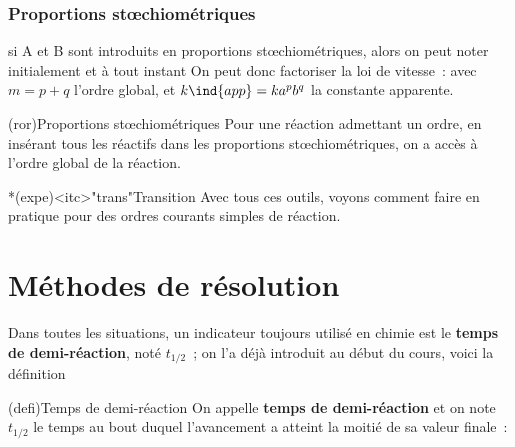 \documentclass[../../main/main.tex]{subfiles}
\begin{document}
\subsubsection{Proportions stœchiométriques}
\smallbreak
\noindent
si A et B sont introduits en proportions stœchiométriques, alors on peut
noter initialement
\psw{
	\[
		[{\ce{A}}]_0 = ac_0
		\qet
		[{\ce{B}}]_0 = bc_0
	\]
}
et à tout instant
\psw{
	\[
		\boxed{
			[{\ce{A}}] = a (c_0 - x)
			\qet
			[{\ce{B}}] = b (c_0 - x)
		}
	\]
}
On peut donc factoriser la loi de vitesse~:
avec $m = p + q$ l'ordre global, et $k\ind{app} = ka^{p}b^{q}$ la constante
apparente.

\begin{tcb}[label=prop:stoe, bld, cnt](ror){Proportions stœchiométriques}
	Pour une réaction admettant un ordre, en insérant tous les réactifs dans les
	proportions stœchiométriques, on a accès à l'ordre global de la réaction.
\end{tcb}

\begin{tcb}*(expe)<itc>"trans"{Transition}
	Avec tous ces outils, voyons comment faire en pratique pour des ordres
	courants simples de réaction.
\end{tcb}

\section{Méthodes de résolution}

Dans toutes les situations, un indicateur toujours utilisé en chimie est le
\textbf{temps de demi-réaction}, noté $t_{1/2}$~; on l'a déjà introduit au début
du cours, voici la définition

\begin{tcb}[label=def:tundemi](defi){Temps de demi-réaction}
	On appelle \textbf{temps de demi-réaction} et on note $t_{1/2}$ le temps au
	bout duquel l'avancement a atteint la moitié de sa valeur finale~:
	\psw{
		\[\boxed{\xi(t_{1/2}) = \frac{\xi_f}{2}}\]
	}
\end{tcb}
\end{document}
